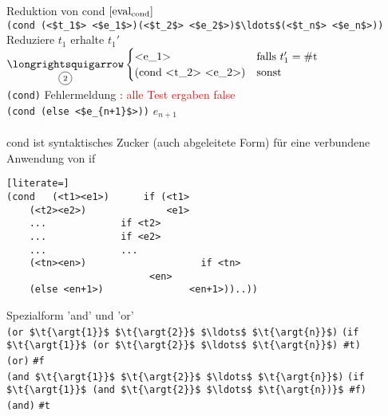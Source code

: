 Reduktion von cond $\lbrack \text{eval}_{\text{cond}}\rbrack $\\
\lstinline[mathescape]!(cond (<$t_1$> <$e_1$>)(<$t_2$> <$e_2$>)$\ldots$(<$t_n$> <$e_n$>))!\\
 Reduziere $t_1$ erhalte $t_1'$ $\underset{\t{\circled{2}}}{\t{\eval}} \begin{cases}
\t{\lstinline[mathescape]!<e_1>!} & \t{falls }t_1' = \t{\lstinline!#t!}\\
(\t{\lstinline[mathescape]!cond <t_2> <e_2>)!} & \t{sonst}
\end{cases}$\\
\lstinline[mathescape]!(cond)! \eval \glqq Fehlermeldung : \textcolor{red}{alle Test ergaben false} \grqq\\
\lstinline[mathescape]!(cond (else <$e_{n+1}$>))! \eval $e_{n+1}$\\
\bigskip\\
cond ist syntaktisches Zucker (auch abgeleitete Form) für eine verbundene Anwendung von if \\
\begin{lstlisting}[literate=]
(cond 	(<t1><e1>) 		if (<t1>
	(<t2><e2>)	    	    <e1>
	...				if <t2>
	...				if <e2>
	...				...
	(<tn><en>)       	    	  if <tn>
					     <en>
	(else <en+1>)  	 			<en+1>))..))
\end{lstlisting}
Spezialform 'and' und 'or' \\
\lstinline[mathescape]!(or $\t{\argt{1}}$ $\t{\argt{2}}$ $\ldots$ $\t{\argt{n}}$)! \eval \lstinline[mathescape]!(if $\t{\argt{1}}$ (or $\t{\argt{2}}$ $\ldots$ $\t{\argt{n}}$) #t)!\\
\lstinline[mathescape]!(or)! \eval \lstinline[mathescape]!#f! \\
\lstinline[mathescape]!(and $\t{\argt{1}}$ $\t{\argt{2}}$ $\ldots$ $\t{\argt{n}}$)! \eval \lstinline[mathescape]!(if $\t{\argt{1}}$ (and $\t{\argt{2}}$ $\ldots$ $\t{\argt{n})}$ #f)!\\
\lstinline[mathescape]!(and)! \eval \lstinline[mathescape]!#t!
\newpage
{}
